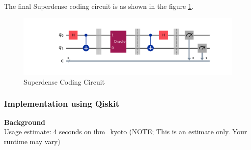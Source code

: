 \documentclass[12pt, oneside]{book}
\theoremstyle{definition}
\theoremstyle{definition}
\theoremstyle{remark}
\begin{document}
The final Superdense coding circuit is as shown in the figure \ref{fig:superdense-coding}.
\begin{figure}[H]
    \centering
    \includegraphics[width=1\textwidth]{../images/superdense-coding4.png}
    \caption{Superdense Coding Circuit}
    \label{fig:superdense-coding}
\end{figure}

\subsubsection{Implementation using Qiskit}
\textbf{Background}\\
Usage estimate: 4 seconds on ibm\_kyoto (NOTE; This is an estimate only. Your runtime may
vary)
\end{document}
